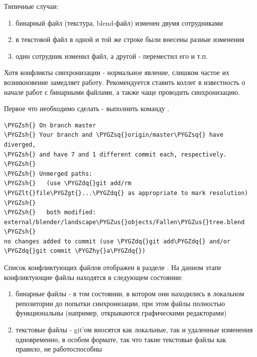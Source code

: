 \documentclass[a4paper,12pt,oneside]{sphinxmanual}
\def\PYGZus{\char`\_}
\def\PYGZlt{\char`\<}
\def\PYGZgt{\char`\>}
\def\PYGZsh{\char`\#}
\def\PYGZhy{\char`\-}
\def\PYGZsq{\char`\'}
\def\PYGZdq{\char`\"}
\begin{document}
Типичные случаи:
\begin{enumerate}
\item {} 
бинарный файл (текстура, blend-файл) изменен двумя сотрудниками

\item {} 
в текстовой файл в одной и той же строке были внесены разные изменения

\item {} 
один сотрудник изменил файл, а другой - переместил его и т.п.

\end{enumerate}

Хотя конфликты синхронизации - нормальное явление, слишком частое их возникновение замедляет работу. Рекомендуется ставить коллег в известность о начале работ с бинарными файлами, а также чаще проводить синхронизацию.

Первое что необходимо сделать - выполнить команду .

\begin{Verbatim}[commandchars=\\\{\}]
\PYGZsh{} On branch master
\PYGZsh{} Your branch and \PYGZsq{}origin/master\PYGZsq{} have diverged,
\PYGZsh{} and have 7 and 1 different commit each, respectively.
\PYGZsh{}
\PYGZsh{} Unmerged paths:
\PYGZsh{}   (use \PYGZdq{}git add/rm \PYGZlt{}file\PYGZgt{}...\PYGZdq{} as appropriate to mark resolution)
\PYGZsh{}
\PYGZsh{}   both modified:      external/blender/landscape\PYGZus{}objects/Fallen\PYGZus{}tree.blend
\PYGZsh{}
no changes added to commit (use \PYGZdq{}git add\PYGZdq{} and/or \PYGZdq{}git commit \PYGZhy{}a\PYGZdq{})
\end{Verbatim}

Список конфликтующих файлов отображен в разделе . На данном этапе конфликтующие файлы находятся в следующем состоянии:
\begin{enumerate}
\item {} 
бинарные файлы - в том состоянии, в котором они находились в локальном репозитории до попытки синхронизации, при этом файлы полностью функциональны (например, открываются графическими редакторами)

\item {} 
текстовые файлы - git'ом вносятся как локальные, так и удаленные изменения одновременно, в особом формате, так что такие текстовые файлы как правило, не работоспособны

\end{enumerate}
\end{document}
